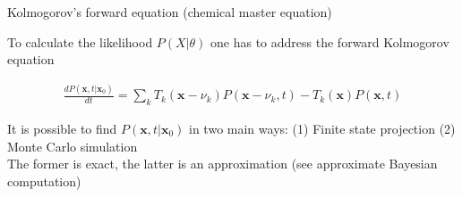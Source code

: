\documentclass[aspectratio=1610]{beamer}					%
\begin{document}
\begin{frame}{Kolmogorov's forward equation (chemical master equation)}

To calculate the likelihood $P(X|\theta)$ one has to address the forward Kolmogorov equation

\vspace{0.1in}

\begin{align*}
\frac{dP(\mathbf{x},t|\mathbf{x}_{0})}{dt} = \sum_{k} T_{k}(\mathbf{x}-\nu_{k})P(\mathbf{x}-\nu_{k},t) - T_{k}(\mathbf{x})P(\mathbf{x},t)
\end{align*}

It is possible to find $P(\mathbf{x},t|\mathbf{x}_{0})$ in two main ways: (1) Finite state projection (2) Monte Carlo simulation\\
\vspace{0.2in}
The former is exact, the latter is an approximation (see approximate Bayesian computation)

\end{frame}
\end{document}

